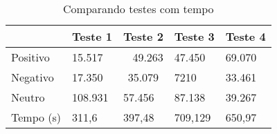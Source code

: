 \begin{table}[H]		
	\centering
	\caption{Comparando testes com tempo}
	\label{teste_tempo}
	\begin{tabular}{l|l|c|l|l|}
		\cline{2-5}
		\multicolumn{1}{c|}{} & \multicolumn{1}{c|}{Teste 1} & Teste 2 & \multicolumn{1}{c|}{Teste 3} & \multicolumn{1}{c|}{Teste 4} \\ \hline
		\multicolumn{1}{|l|}{Positivo} & 15.517 & \multicolumn{1}{r|}{49.263} & 47.450 & 69.070 \\ \hline
		\multicolumn{1}{|l|}{Negativo} & 17.350 & 35.079 & 7210 & 33.461 \\ \hline
		\multicolumn{1}{|l|}{Neutro} & 108.931 & \multicolumn{1}{l|}{57.456} & 87.138 & 39.267 \\ \hline
		\multicolumn{1}{|l|}{Tempo (s)} & 311,6  & \multicolumn{1}{l|}{397,48} & 709,129 &650,97 \\ \hline
	\end{tabular}
\end{table}